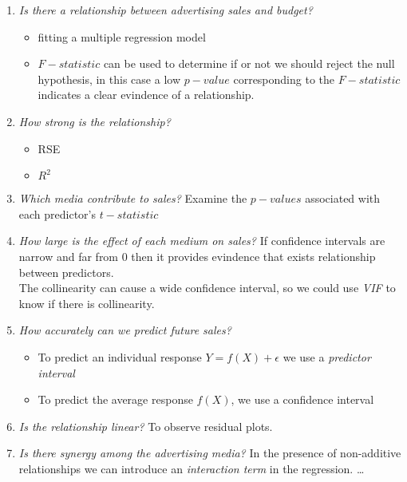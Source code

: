 \begin{enumerate}
	\item \emph{Is there a relationship between advertising sales
		and budget?}
		\begin{itemize}
			\item fitting a multiple regression model
			\item $F-statistic$ can be used to determine if
				or not we should reject the null 
				hypothesis, in this case a low 
				$p-value$ corresponding to the 
				$F-statistic$ indicates a clear
				evindence of a relationship.
		\end{itemize}
	\item \emph{How strong is the relationship?}
		\begin{itemize}
			\item RSE
			\item $R^{2}$
		\end{itemize}
	\item \emph{Which media contribute to sales?}
		Examine the $p-values$ associated with each 
		predictor's $t-statistic$
	\item \emph{How large is the effect of each medium on sales?}
		If confidence intervals are narrow and far from $0$ 
		then it provides evindence that exists relationship 
		between predictors.\\The collinearity can cause a wide
		confidence interval, so we could use \emph{VIF} to know
		if there is collinearity.
	\item \emph{How accurately can we predict future sales?}
		\begin{itemize}
			\item To predict an individual response $Y=
				f\left(X\right)+\epsilon$
				we use a \emph{predictor interval}
			\item To predict the average response $f\left(
				X\right)$, we use a confidence interval
		\end{itemize}
	\item \emph{Is the relationship linear?}
		To observe residual plots.
	\item \emph{Is there synergy among the advertising media?}
		In the presence of non-additive relationships we can
		introduce an \emph{interaction term} in the regression.
	\ldots
 \end{enumerate}
